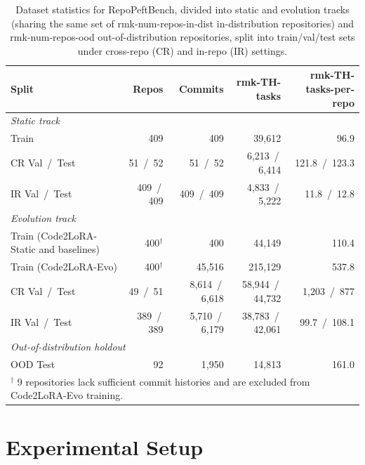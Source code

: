 \documentclass[11pt]{article}
\newcommand{\UseMacro}[1]{\csname rmk-#1\endcsname}
\newcommand{\codelora}{Code2LoRA\xspace}
\newcommand{\repopeftbench}{RepoPeftBench\xspace}
\newcommand{\codelorastatic}{\codelora-Static\xspace}
\newcommand{\codeloraevo}{\codelora-Evo\xspace}
\begin{document}
\begin{table}[t]
\begin{small}
\begin{center}
\caption{Dataset statistics for \repopeftbench{}, divided into static and evolution tracks (sharing the same set of \UseMacro{num-repos-in-dist} in-distribution repositories) and \UseMacro{num-repos-ood} out-of-distribution repositories, split into train/val/test sets under cross-repo (CR) and in-repo (IR) settings.}
\label{tab:dataset_actual}

\setlength{\tabcolsep}{4pt}
\begin{tabular}{l r r r r}
\toprule
Split & Repos & Commits & \UseMacro{TH-tasks} & \UseMacro{TH-tasks-per-repo} \\
\midrule
\multicolumn{5}{l}{\emph{Static track}} \\
\midrule
Train             & 409 & 409 & 39{,}612 & 96.9 \\
CR Val \,/\, Test &  51 \,/\,  52 &  51 \,/\,  52 & 6{,}213 \,/\, 6{,}414 & 121.8 \,/\, 123.3 \\
IR Val \,/\, Test & 409 \,/\, 409 & 409 \,/\, 409 & 4{,}833 \,/\, 5{,}222 &  11.8 \,/\,  12.8 \\
\midrule
\multicolumn{5}{l}{\emph{Evolution track}} \\
\midrule
Train (\codelorastatic{} and baselines) & 400$^\dagger$ & 400 & 44{,}149 & 110.4 \\
Train (\codeloraevo{})     & 400$^\dagger$ & 45{,}516 & 215{,}129 & 537.8 \\
CR Val \,/\, Test &  49 \,/\,  51 & 8{,}614 \,/\, 6{,}618 & 58{,}944 \,/\, 44{,}732 & 1{,}203 \,/\,    877 \\
IR Val \,/\, Test & 389 \,/\, 389 & 5{,}710 \,/\, 6{,}179 & 38{,}783 \,/\, 42{,}061 &     99.7 \,/\, 108.1 \\
\midrule
\multicolumn{5}{l}{\emph{Out-of-distribution holdout}} \\
\midrule
OOD Test          & 92 & 1{,}950 & 14{,}813 & 161.0 \\
\bottomrule
\multicolumn{5}{l}{\footnotesize $^\dagger$ 9 repositories lack sufficient commit histories and are excluded from \codeloraevo{} training.}
\end{tabular}


\end{center}
\end{small}
\end{table}




\section{Experimental Setup}
\label{sec:setup}
\end{document}
